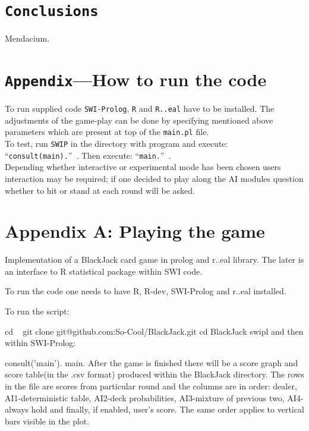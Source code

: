\documentclass[12pt,a4paper,twocolumn]{article}
\begin{document}
\section*{\texttt{Conclusions}}
Mendacium.

\section*{\texttt{Appendix}---How to run the code}
To run supplied code \texttt{SWI-Prolog}, \texttt{R} and \texttt{R..eal} have to be installed. The adjustments of the game-play can be done by specifying mentioned above parameters which are present at top of the \texttt{main.pl} file.\\
To test, run \texttt{SWIP} in the directory with program and execute: ``\texttt{consult(main).}''~. Then execute: ``\texttt{main.}''~.\\
Depending whether interactive or experimental mode has been chosen users interaction may be required; if one decided to play along the AI modules question whether to hit or stand at each round will be asked.\\

\section*{Appendix A: Playing the game}
Implementation of a BlackJack card game in prolog and r..eal library. The later is an interface to R statistical package within SWI code.

To run the code one needs to have R, R-dev, SWI-Prolog and r..eal installed.


To run the script:

 cd ~
 git clone git@github.com:So-Cool/BlackJack.git
 cd BlackJack
 swipl
and then within SWI-Prolog:

consult('main').
main.
After the game is finished there will be a score graph and score table(in the .csv format) produced within the BlackJack directory. The rows in the file are scores from particular round and the columns are in order: dealer, AI1-deterministic table, AI2-deck probabilities, AI3-mixture of previous two, AI4-always hold and finally, if enabled, user's score. The same order applies to vertical bars visible in the plot.

\end{document}
